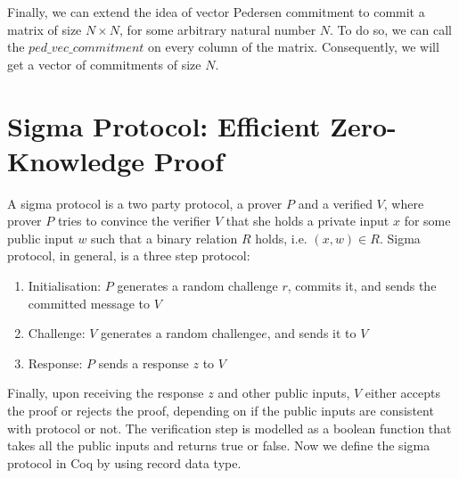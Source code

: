  
\noindent
Finally,  we can extend the idea of vector Pedersen commitment to commit a matrix of size  $N \times N$,  for some arbitrary natural number $N$.
To do so, we can call the $ped\_vec\_commitment$ on every column of the matrix.   Consequently, 
we  will get a vector of commitments of size $N$.



\section{Sigma Protocol: Efficient Zero-Knowledge Proof}
\label{sec:sigma_coq}
A sigma protocol is a two party protocol, a prover $P$ and a verified $V$, where prover $P$ tries to convince the verifier $V$ that she 
holds a private input $x$ for some public input $w$ such that a binary relation $R$ holds, i.e. $(x, w) \in R$.  Sigma protocol, 
in general, is a three step protocol:
\begin{enumerate}
\item Initialisation: $P$ generates a random challenge $r$, commits it, and sends the committed message to $V$
\item Challenge: $V$ generates a random challenge$e$, and sends it to $V$
\item Response: $P$ sends a response $z$ to $V$
\end{enumerate} 

\noindent
Finally, upon receiving the response $z$ and other public inputs, $V$ 
either accepts the proof or rejects the proof,  depending on if the public inputs are consistent with protocol or not.  The verification step is 
modelled as a boolean function that takes all the public inputs and returns true or false.  
Now we define the sigma protocol in Coq by using record data type.

